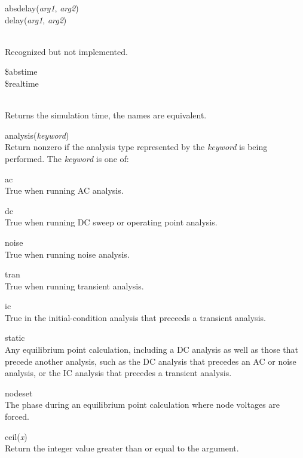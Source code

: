 \begin{description}
\item{\parbox{4in}{
{\vt absdelay}({\it arg1\/}, {\it arg2\/})\\
{\vt delay}({\it arg1\/}, {\it arg2\/})}}\\
Recognized but not implemented.

\item{\parbox{4in}{
{\vt \$abstime}\\
{\vt \$realtime}}}\\
Returns the simulation time, the names are equivalent.

\item{\vt analysis}({\it keyword\/})\\
Return nonzero if the analysis type represented by the {\it keyword}
is being performed.  The {\it keyword} is one of:
\begin{description}

\item{\vt ac}\\
True when running AC analysis.

\item{\vt dc}\\
True when running DC sweep or operating point analysis.

\item{\vt noise}\\
True when running noise analysis.

\item{\vt tran}\\
True when running transient analysis.

\item{\vt ic}\\
True in the initial-condition analysis that preceeds a transient
analysis.

\item{\vt static}\\
Any equilibrium point calculation, including a DC analysis as well as
those that precede another analysis, such as the DC analysis that
precedes an AC or noise analysis, or the IC analysis that precedes a
transient analysis.

\item{\vt nodeset}\\
The phase during an equilibrium point calculation where node voltages
are forced.
\end{description}

\item{\vt ceil}({\it x\/})\\
Return the integer value greater than or equal to the argument.


\end{description}
